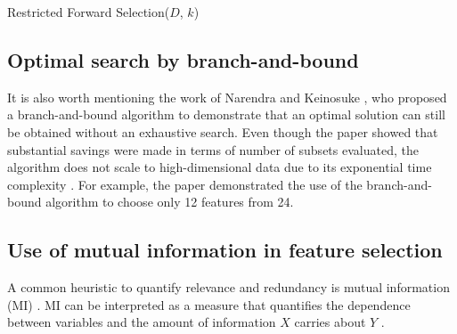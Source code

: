 \documentclass[12pt, twoside, a4paper]{report}
\begin{document}
\begin{algorithm}
\DontPrintSemicolon
{}
\BlankLine
{}
\caption{Restricted Forward Selection($D$, $k$) \label{RFSAlgo}}
\end{algorithm}

\subsection{Optimal search by branch-and-bound}
It is also worth mentioning the work of Narendra and Keinosuke \cite{RefWorks:176}, who proposed a branch-and-bound algorithm to demonstrate that an optimal solution can still be obtained without an exhaustive search. Even though the paper showed that substantial savings were made in terms of number of subsets evaluated, the algorithm does not scale to high-dimensional data \cite{RefWorks:178} due to its exponential time complexity \cite{RefWorks:190, RefWorks:189}. For example, the paper demonstrated the use of the branch-and-bound algorithm to choose only 12 features from 24.

\subsection{Use of mutual information in feature selection} \label{bg:fs:mi}

A common heuristic to quantify relevance and redundancy is mutual information (MI) \cite{RefWorks:98}. MI can be interpreted as a measure that quantifies the dependence between variables \cite{RefWorks:180} and the amount of information $X$ carries about $Y$ \cite{RefWorks:181}. 
\end{document}
